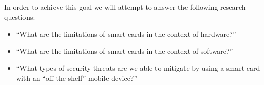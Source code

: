 In order to achieve this goal we will attempt to answer the following research questions:
\begin{itemize}
  \item ``What are the limitations of smart cards in the context of hardware?''
  \item ``What are the limitations of smart cards in the context of software?''
  \item ``What types of security threats are we able to mitigate by using a smart card with an ``off-the-shelf'' mobile device?''
\end{itemize}





